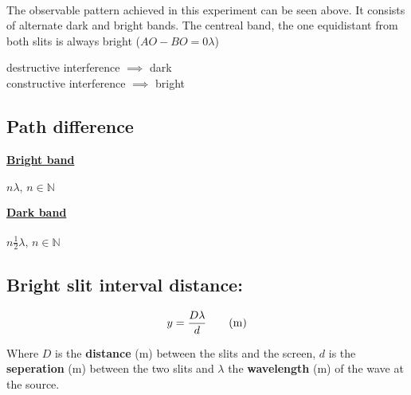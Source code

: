 \documentclass[11pt]{article}
\begin{document}
\begin{center}
\\
The observable pattern achieved in this experiment can be seen above. It consists of alternate dark and bright bands. The centreal band, the one equidistant from both slits is always bright ($AO - BO = 0\lambda$)
\begin{multicols}{2}
	destructive interference $\implies$ dark\\
	constructive interference $\implies$ bright
\end{multicols}
\end{center}
\subsection{Path difference}
\begin{multicols}{2}
	\begin{center}
		\textbf{\underline{Bright band}}\\
		~\\
		$n\lambda,\, n \in \mathbb{N}$
	\end{center}
	\begin{center}
	\textbf{\underline{Dark band}}\\
	~\\
	$n\frac12\lambda,\, n \in \mathbb{N}$
\end{center}
\end{multicols}
\subsection{Bright slit interval distance: }
\begin{equation}
	y=\frac{D\lambda}{d}\tag{\si{\meter}}
\end{equation}
\begin{center}
	Where $D$ is the \textbf{distance} (\si{\meter}) between the slits and the screen, $d$ is the \textbf{seperation} ({\si{\meter}}) between the two slits and $\lambda$ the \textbf{wavelength} (\si{\meter}) of the wave at the source.
\end{center}
\end{document}
